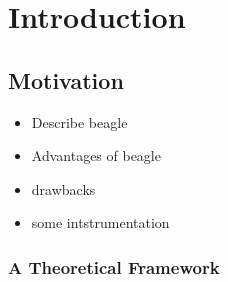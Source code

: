 
\chapter{Introduction}
\label{cha:intro}

\section{Motivation}
\label{sec:mot}

\begin{itemize}
\item Describe beagle
\item Advantages of beagle
\item drawbacks
\item some intstrumentation
\end{itemize}

\subsection{A Theoretical Framework}
\label{sec:framework}

